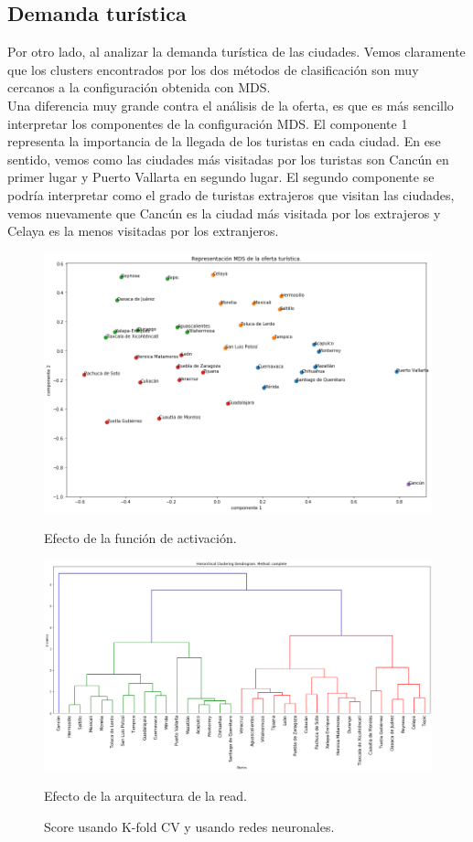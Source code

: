 \documentclass[11pt,letterpaper]{article}
\begin{document}
\subsection{Demanda turística}
Por otro lado, al analizar la demanda turística de las ciudades. Vemos claramente que los clusters encontrados por los dos métodos de clasificación son muy cercanos a la configuración obtenida con MDS.\\

Una diferencia muy grande contra el análisis de la oferta, es que es más sencillo interpretar los componentes de la configuración MDS. El componente 1 representa la importancia de la llegada de los turistas en cada ciudad. En ese sentido, vemos como las ciudades más visitadas por los turistas son Cancún en primer lugar y Puerto Vallarta en segundo lugar. El segundo componente se podría interpretar como el grado de turistas extrajeros que visitan las ciudades, vemos nuevamente que Cancún es la ciudad más visitada por los extrajeros y Celaya es la menos visitadas por los extranjeros.
\begin{figure}[H]
  \includegraphics[width=\linewidth]{figure/knn_demanda_c.png}
  \caption{Efecto de la función de activación.}\label{act}
\endminipage\hfill
{}
  \includegraphics[width=\linewidth]{figure/herarquico_demanda_c.png}\caption{Efecto de la arquitectura de la read.}\label{arqui}
\endminipage
\caption{Score usando K-fold CV y usando redes neuronales.}\label{oferta_turistica}
\end{figure}
\end{document}
